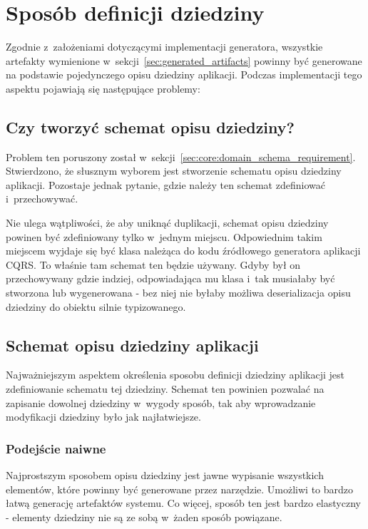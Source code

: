 \section{Sposób definicji dziedziny} \label{sec:domain_schema_definition}

Zgodnie z~założeniami dotyczącymi implementacji generatora, wszystkie artefakty wymienione w~sekcji~\ref{sec:generated_artifacts} powinny być generowane na podstawie pojedynczego opisu dziedziny aplikacji.
Podczas implementacji tego aspektu pojawiają się następujące problemy:


\subsection{Czy tworzyć schemat opisu dziedziny?}

Problem ten poruszony został w~sekcji~\ref{sec:core:domain_schema_requirement}.
Stwierdzono, że słusznym wyborem jest stworzenie schematu opisu dziedziny aplikacji.
Pozostaje jednak pytanie, gdzie należy ten schemat zdefiniować i~przechowywać.

Nie ulega wątpliwości, że aby uniknąć duplikacji, schemat opisu dziedziny powinen być zdefiniowany tylko w~jednym miejscu.
Odpowiednim takim miejscem wyjdaje się być klasa należąca do kodu źródłowego generatora aplikacji CQRS.
To właśnie tam schemat ten będzie używany.
Gdyby był on przechowywany gdzie indziej, odpowiadająca mu klasa i~tak musiałaby być stworzona lub wygenerowana - bez niej nie byłaby możliwa deserializacja opisu dziedziny do obiektu silnie typizowanego.


\subsection{Schemat opisu dziedziny aplikacji} \label{sec:domain_descr_schema}

Najważniejszym aspektem określenia sposobu definicji dziedziny aplikacji jest zdefiniowanie schematu tej dziedziny.
Schemat ten powinien pozwalać na zapisanie dowolnej dziedziny w~wygody sposób, tak aby wprowadzanie modyfikacji dziedziny było jak najłatwiejsze.

\subsubsection{Podejście naiwne}

Najprostszym sposobem opisu dziedziny jest jawne wypisanie wszystkich elementów, które powinny być generowane przez narzędzie.
Umożliwi to bardzo łatwą generację artefaktów systemu.
Co więcej, sposób ten jest bardzo elastyczny - elementy dziedziny nie są ze sobą w~żaden sposób powiązane.

